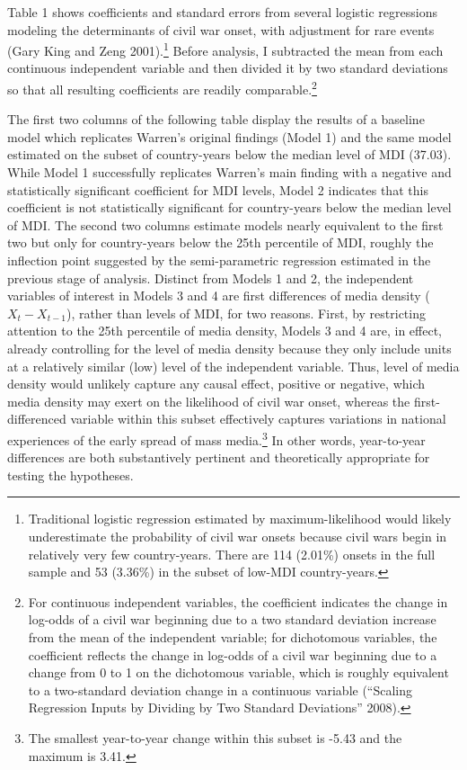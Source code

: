 \documentclass[11pt,article,oneside]{memoir}
\begin{document}
Table 1 shows coefficients and standard errors from several logistic
regressions modeling the determinants of civil war onset, with
adjustment for rare events (Gary King and Zeng 2001).\footnote{Traditional
  logistic regression estimated by maximum-likelihood would likely
  underestimate the probability of civil war onsets because civil wars
  begin in relatively very few country-years. There are 114 (2.01\%)
  onsets in the full sample and 53 (3.36\%) in the subset of low-MDI
  country-years.} Before analysis, I subtracted the mean from each
continuous independent variable and then divided it by two standard
deviations so that all resulting coefficients are readily
comparable.\footnote{For continuous independent variables, the
  coefficient indicates the change in log-odds of a civil war beginning
  due to a two standard deviation increase from the mean of the
  independent variable; for dichotomous variables, the coefficient
  reflects the change in log-odds of a civil war beginning due to a
  change from 0 to 1 on the dichotomous variable, which is roughly
  equivalent to a two-standard deviation change in a continuous variable
  (``Scaling Regression Inputs by Dividing by Two Standard Deviations''
  2008).}

The first two columns of the following table display the results of a
baseline model which replicates Warren's original findings (Model 1) and
the same model estimated on the subset of country-years below the median
level of MDI (37.03). While Model 1 successfully replicates Warren's
main finding with a negative and statistically significant coefficient
for MDI levels, Model 2 indicates that this coefficient is not
statistically significant for country-years below the median level of
MDI. The second two columns estimate models nearly equivalent to the
first two but only for country-years below the 25th percentile of MDI,
roughly the inflection point suggested by the semi-parametric regression
estimated in the previous stage of analysis. Distinct from Models 1 and
2, the independent variables of interest in Models 3 and 4 are first
differences of media density ($X_{t} - X_{t-1}$), rather than levels of
MDI, for two reasons. First, by restricting attention to the 25th
percentile of media density, Models 3 and 4 are, in effect, already
controlling for the level of media density because they only include
units at a relatively similar (low) level of the independent variable.
Thus, level of media density would unlikely capture any causal effect,
positive or negative, which media density may exert on the likelihood of
civil war onset, whereas the first-differenced variable within this
subset effectively captures variations in national experiences of the
early spread of mass media.\footnote{The smallest year-to-year change
  within this subset is -5.43 and the maximum is 3.41.} In other words,
year-to-year differences are both substantively pertinent and
theoretically appropriate for testing the hypotheses.
\end{document}

